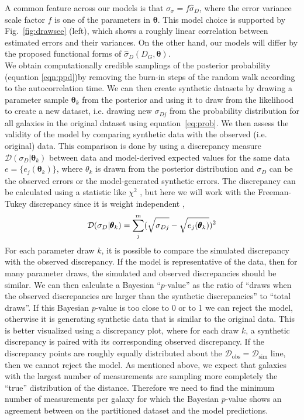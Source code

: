 \documentclass[a4paper,fleqn,usenatbib]{mnras}
\begin{document}
A common feature across our models is that $\sigma_\sigma=f\hat{\sigma}_D$, where the error variance scale factor $f$ is one of the parameters in $\pmb{\theta}$. This model choice is supported by Fig.~\ref{fig:drawsee} (left), which shows a roughly linear correlation between estimated errors and their variances. On the other hand, our models will differ by the proposed functional forms of $\hat{\sigma}_D(D_G,\pmb{\theta})$.\\

We obtain computationally credible samplings of the posterior probability (equation \ref{eqn:ppd})by removing the burn-in steps of the random walk according to the autocorrelation time. We can then create synthetic datasets by drawing a parameter sample $\pmb{\theta}_k$ from the posterior and using it to draw from the likelihood to create a new dataset, i.e. drawing new $\sigma_{Dj}$ from the probability distribution for all galaxies in the original dataset using equation~\ref{eq:prob}. We then assess the validity of the model by comparing synthetic data with the observed (i.e. original) data. This comparison is done by using a discrepancy measure $\mathcal{D}(\sigma_D|\pmb{\theta}_k)$ between data and model-derived expected values for the same data $e=\{e_j(\pmb{\theta}_k)\}$, where $\theta_k$ is drawn from the posterior distribution and $\sigma_D$ can be the observed errors or the model-generated synthetic errors. The discrepancy can be calculated using a statistic like $\chi^2$ \citep{chi2ms,otherdisc}, but here we will work with the Freeman-Tukey discrepancy since it is weight independent \citep{bishopft,brooks}, 
\[\mathcal{D}(\sigma_D|\pmb{\theta}_k)=\sum_j^m(\sqrt{\sigma_{Dj}\vphantom{e_j(\pmb{\theta}_k)}}-\sqrt{e_j(\pmb{\theta}_k)})^2\]
For each parameter draw $k$, it is possible to compare the simulated discrepancy with the observed discrepancy. If the model is representative of the data, then for many parameter draws, the simulated and observed discrepancies should be similar. We can then calculate a Bayesian ``$p$-value'' as the ratio of ``draws when the observed discrepancies are larger than the synthetic discrepancies'' to ``total draws''. If this Bayesian $p$-value is too close to 0 or to 1 we can reject the model, otherwise it is generating synthetic data that is similar to the original data. This is better visualized using a discrepancy plot, where for each draw $k$, a synthetic discrepancy is paired with its corresponding observed discrepancy. If the discrepancy points are roughly equally distributed about the $\mathcal{D}_\mathrm{obs}=\mathcal{D}_\mathrm{sim}$ line, then we cannot reject the model. As mentioned above, we expect that galaxies with the largest number of measurements are sampling more completely the ``true'' distribution of the distance. Therefore we need to find the minimum number of measurements per galaxy for which the Bayesian $p$-value shows an agreement between on the partitioned dataset and the model predictions.
\end{document}
